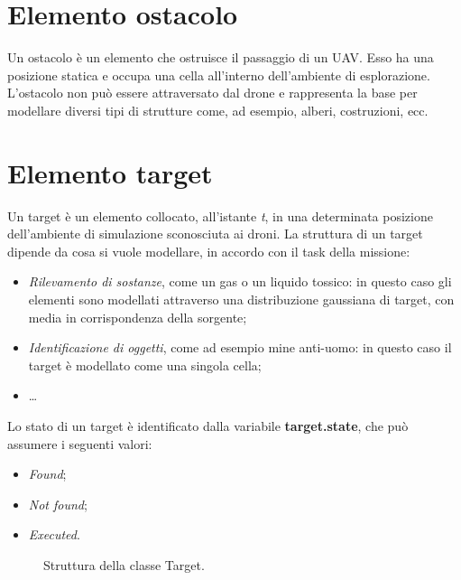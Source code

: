 \section{Elemento ostacolo}

Un ostacolo è un elemento che ostruisce il passaggio di un UAV. 
Esso ha una posizione statica e occupa una cella all’interno dell’ambiente di esplorazione. 
L’ostacolo non può essere attraversato dal drone e rappresenta la base per modellare diversi tipi di strutture come, ad esempio, alberi, costruzioni, ecc.

\section {Elemento target}

Un target è un elemento collocato, all'istante \textit{t}, in una determinata posizione dell’ambiente di simulazione sconosciuta ai droni. 
La struttura di un target dipende da cosa si vuole modellare, in accordo con il task della missione:

\begin{itemize}
    \item \textit{Rilevamento di sostanze}, come un gas o un liquido tossico: in questo caso gli elementi sono modellati attraverso una distribuzione gaussiana di target, con media in corrispondenza della sorgente;
    \item \textit{Identificazione di oggetti}, come ad esempio mine anti-uomo: in questo caso il target è modellato come una singola cella;
    \item \dots
\end{itemize}

Lo stato di un target è identificato dalla variabile \textbf{target.state}, che può assumere i seguenti valori:

\begin{itemize}
    \item \textit{Found};
    \item \textit{Not found};
    \item \textit{Executed}.
\end{itemize}

\begin{figure}[H] 
    \captionsetup{justification=centering, margin=2cm, font=footnotesize}
    \begin{center}
    \end{center}
    \caption[short]{Struttura della classe Target.}
    \label{classe_target}
\end{figure}

